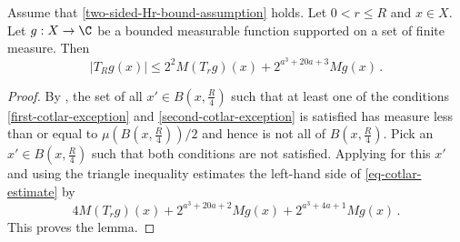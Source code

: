 \begin{lemma}
\label{Cotlar-estimate}
Assume that \eqref{two-sided-Hr-bound-assumption} holds.
Let $0<r\le R$ and  $x\in X$. Let $g:X\to\C$ be a bounded measurable function supported on a set of finite measure. Then
\begin{equation}\label{eq-cotlar-estimate}
|T_Rg(x)| \le 2^{2}M(T_rg)(x)+ 2^{a^3+20a+3} Mg(x)
\, .
\end{equation}
\end{lemma}


\begin{proof}
By , the set of all $x'\in B(x,\frac {R} 4)$
such that at least one of the conditions
\eqref{first-cotlar-exception} and
\eqref{second-cotlar-exception} is satisfied has measure less than or equal to $\mu(B(x,\frac{R}{4}))/2$ and hence is not all of $B(x,\frac {R} 4)$.
Pick an $x'\in B(x,\frac {R} 4)$ such that both conditions are not satisfied.
Applying  for this $x'$ and using the triangle inequality
estimates the left-hand side of \eqref{eq-cotlar-estimate}
by
\begin{equation}
    4 M(T_rg)(x) + 2^{a^3 + 20a + 2} Mg(x) + 2^{a^3 + 4a + 1} Mg(x)\, .
\end{equation}
This proves the lemma.
\end{proof}

